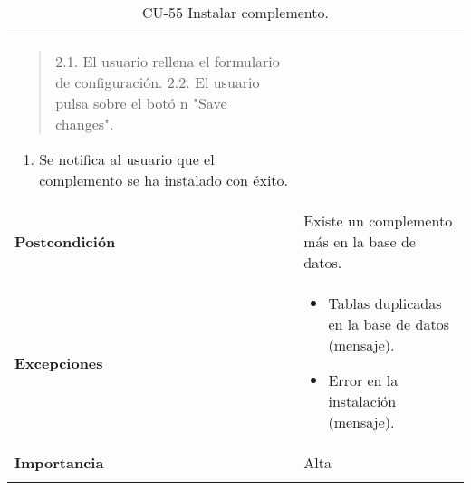 \begin{longtable}[]{@{}ll@{}}
\begin{minipage}[t]{0.71\columnwidth}
\begin{quote}
2.1. El usuario rellena el formulario de configuración. 2.2. El usuario
pulsa sobre el botó n "Save changes".
\end{quote}

\begin{enumerate}
\def\labelenumi{\arabic{enumi}.}
\setcounter{enumi}{2}
\tightlist
\item
  Se notifica al usuario que el complemento se ha instalado con éxito.
\end{enumerate}\strut
\end{minipage}\tabularnewline
\begin{minipage}[t]{0.24\columnwidth}\raggedright
\textbf{Postcondición}\strut
\end{minipage} & \begin{minipage}[t]{0.71\columnwidth}\raggedright
Existe un complemento más en la base de datos.\strut
\end{minipage}\tabularnewline
\begin{minipage}[t]{0.24\columnwidth}\raggedright
\textbf{Excepciones}\strut
\end{minipage} & \begin{minipage}[t]{0.71\columnwidth}\raggedright
\begin{itemize}
\tightlist
\item
  Tablas duplicadas en la base de datos (mensaje).
\item
  Error en la instalación (mensaje).
\end{itemize}\strut
\end{minipage}\tabularnewline
\begin{minipage}[t]{0.24\columnwidth}\raggedright
\textbf{Importancia}\strut
\end{minipage} & \begin{minipage}[t]{0.71\columnwidth}\raggedright
Alta\strut
\end{minipage}\tabularnewline
\bottomrule
\caption{CU-55 Instalar complemento.}
\end{longtable}

